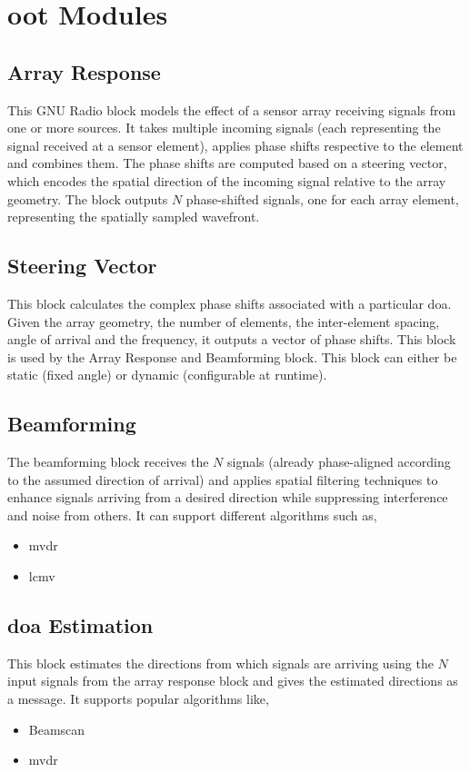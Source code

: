 \chapter{\acf{oot} Modules} \label{ch: oot-modules}

\section{Array Response}

This GNU Radio block models the effect of a sensor array receiving signals from one or more sources. It takes multiple incoming signals (each representing the signal received at a sensor element), applies phase shifts respective to the element and combines them. The phase shifts are computed based on a steering vector, which encodes the spatial direction of the incoming signal relative to the array geometry. The block outputs
$N$ phase-shifted signals, one for each array element, representing the spatially sampled wavefront.

\section{Steering Vector}

This block calculates the complex phase shifts associated with a particular \ac{doa}. Given the array geometry, the number of elements, the inter-element spacing, angle of arrival and the frequency, it outputs a vector of phase shifts. This block is used by the Array Response and Beamforming block. This block can either be static (fixed angle) or dynamic (configurable at runtime).

\section{Beamforming}

The beamforming block receives the $N$ signals (already phase-aligned according to the assumed direction of arrival) and applies spatial filtering techniques to enhance signals arriving from a desired direction while suppressing interference and noise from others. It can support different algorithms such as,

\begin{itemize}
	\item \ac{mvdr}
	\item \ac{lcmv}
\end{itemize}


\section{\acf{doa} Estimation}

This block estimates the directions from which signals are arriving using the $N$ input signals from the array response block and gives the estimated directions as a message. It supports popular algorithms like,

\begin{itemize}
	\item Beamscan
	\item \ac{mvdr}
\end{itemize}